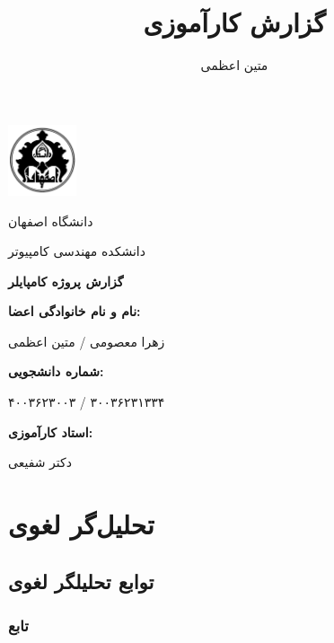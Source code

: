 \documentclass[12pt, a4paper]{report}
\title{گزارش کارآموزی}
\author{متین اعظمی}
\begin{document}
\begin{titlepage}
	\centering
	\includegraphics[width=0.15\textwidth]{images/logo.png}
	
	{\Large دانشگاه اصفهان}\par
	{\Large دانشکده مهندسی کامپیوتر}\par\vspace{2cm}
	
	\textbf
	{\Huge گزارش پروژه کامپایلر}\par\vspace{1.5cm}
	
	\large
	\textbf{نام و نام خانوادگی اعضا:}\par{زهرا معصومی / متین اعظمی}\par\vspace{0.5cm}  
	\textbf{شماره دانشجویی:}\par{۴۰۰۳۶۲۳۰۰۳ / ۳۰۰۳۶۲۳۱۳۳۴}\par\vspace{0.5cm}
	\textbf{استاد کارآموزی:}\par{دکتر شفیعی}\par\vspace{0.5cm}
		
	\par\vspace{2cm}
	
	
\end{titlepage}

\tableofcontents

\listoftables

\listoffigures


\chapter{تحلیل‌گر لغوی}
\section{توابع تحلیلگر لغوی}

\subsection{تابع }
\label{subsec:is_keyword}
\end{document}
